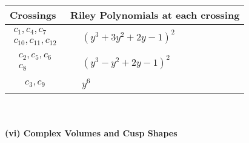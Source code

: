 \documentclass[1p]{elsarticle_modified}
\theoremstyle{definition}
\begin{document}
\begin{tabular}{m{50pt}|m{274pt}}
Crossings & \hspace{64pt}Riley Polynomials at each crossing \\
\hline $$\begin{aligned}c_{1},c_{4},c_{7}\\c_{10},c_{11},c_{12}\end{aligned}$$&$\begin{aligned}
&(y^3+3 y^2+2 y-1)^2
\end{aligned}$\\
\hline $$\begin{aligned}c_{2},c_{5},c_{6}\\c_{8}\end{aligned}$$&$\begin{aligned}
&(y^3- y^2+2 y-1)^2
\end{aligned}$\\
\hline $$\begin{aligned}c_{3},c_{9}\end{aligned}$$&$\begin{aligned}
&y^6
\end{aligned}$\\
\hline
\end{tabular}\\~\\
\newpage\flushleft \textbf{(vi) Complex Volumes and Cusp Shapes}
\end{document}
